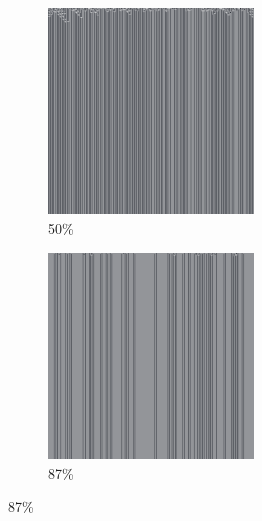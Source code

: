 \documentclass[12pt, fleqn]{report}                             %
\theoremstyle{break}                                            %
\begin{document}
\begin{figure}[ht!]
\begin{subfigure}[b]{0.4\linewidth}
          \includegraphics[width=0.6\textwidth]{Images/37/c.png}
          \caption{50\%}
        \end{subfigure}
        \begin{subfigure}[b]{0.4\linewidth}
          \includegraphics[width=0.6\textwidth]{Images/37/d.png}
          \caption{87\%}
        \end{subfigure}
      \end{figure}
\end{document}
